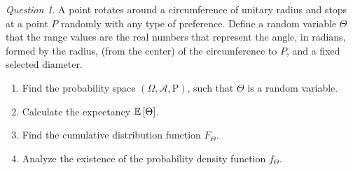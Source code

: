 \documentclass[11pt]{article}
\theoremstyle{definition}
\theoremstyle{remark}
\theoremstyle{remark}
\newtheorem{question}{Question}
\begin{document}
\begin{question}
  A point rotates around a circumference of unitary radius and stops
  at a point $P$ randomly with any type of preference. Define a random
  variable $\Theta$ that the range values are the real numbers that
  represent the angle, in radians, formed by the radius, (from the
  center) of the circumference to $P$, and a fixed selected
  diameter.
  \begin{enumerate}[label=\alph*)]
  \item Find the probability space
    $(\Omega, \mathcal{A}, \mathrm{P})$, such that $\Theta$ is a
    random variable.
  \item Calculate the expectancy $\E{\Theta}$.
  \item Find the cumulative distribution function $F_\Theta$.
  \item Analyze the existence of the probability density function
    $f_\Theta$.
  \end{enumerate}
\end{question}
\end{document}

